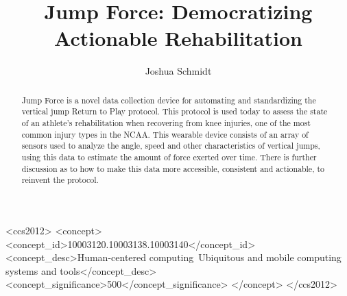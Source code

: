 \documentclass[manuscript,screen,review]{acmart}
\begin{document}
\title{Jump Force: Democratizing Actionable Rehabilitation}

\author{Joshua Schmidt}

\renewcommand{\shortauthors}{Schmidt, et al.}

\begin{abstract}
  Jump Force is a novel data collection device for automating and standardizing the vertical jump Return to Play protocol. This protocol is used today to assess the state of an athlete's rehabilitation when recovering from knee injuries, one of the most common injury types in the NCAA. This wearable device consists of an array of sensors used to analyze the angle, speed and other characteristics of vertical jumps, using this data to estimate the amount of force exerted over time. There is further discussion as to how to make this data more accessible, consistent and actionable, to reinvent the protocol.
\end{abstract}

\begin{CCSXML}
<ccs2012>
   <concept>
       <concept_id>10003120.10003138.10003140</concept_id>
       <concept_desc>Human-centered computing~Ubiquitous and mobile computing systems and tools</concept_desc>
       <concept_significance>500</concept_significance>
       </concept>
 </ccs2012>
\end{CCSXML}

\end{document}
